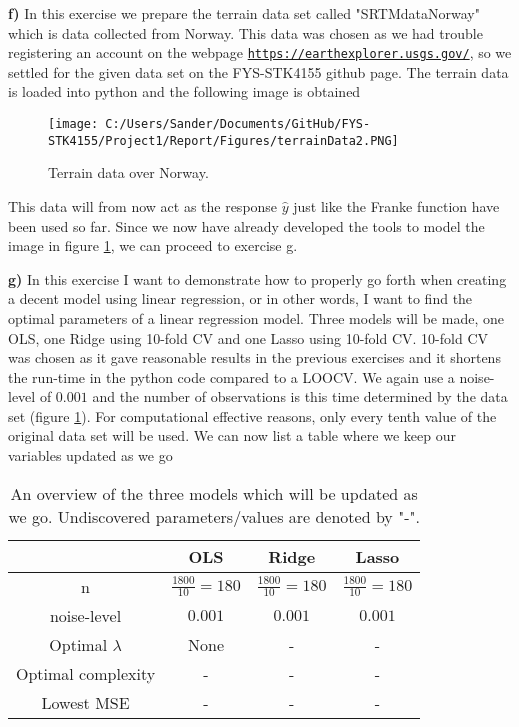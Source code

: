 \documentclass[12pt,a4paper]{article}
\begin{document}
\newpage

\noindent \textbf{f)} In this exercise we prepare the terrain data set called "SRTM\textunderscore data\textunderscore Norway" which is data collected from Norway. This data was chosen as we had trouble registering an account on the webpage \href{{https://earthexplorer.usgs.gov/}}{\nolinkurl{https://earthexplorer.usgs.gov/}}, so we settled for the given data set on the FYS-STK4155 github page. The terrain data is loaded into python and the following image is obtained

\begin{figure}[H]
\centering
\texttt{[image: C:/Users/Sander/Documents/GitHub/FYS-STK4155/Project1/Report/Figures/terrainData2.PNG]}
\caption{\label{fig:terrainData1} Terrain data over Norway.}
\end{figure}

\noindent This data will from now act as the response $\hat{y}$ just like the Franke function have been used so far. Since we now have already developed the tools to model the image in figure \ref{fig:terrainData1}, we can proceed to exercise g.

\newpage

\noindent \textbf{g)} In this exercise I want to demonstrate how to properly go forth when creating a decent model using linear regression, or in other words, I want to find the optimal parameters of a linear regression model. Three models will be made, one OLS, one Ridge using 10-fold CV and one Lasso using 10-fold CV. 10-fold CV was chosen as it gave reasonable results in the previous exercises and it shortens the run-time in the python code compared to a LOOCV. We again use a noise-level of $0.001$ and the number of observations is this time determined by the data set (figure \ref{fig:terrainData1}). For computational effective reasons, only every tenth value of the original data set will be used. We can now list a table where we keep our variables updated as we go

\begin{table}[h]
\caption{\label{tab:update1} An overview of the three models which will be updated as we go. Undiscovered parameters/values are denoted by "-".}
\centering
\begin{tabular}{c|c|c|c}
 & OLS & Ridge & Lasso\\
\hline
n & $\frac{1800}{10} = 180$ & $\frac{1800}{10} = 180$ & $\frac{1800}{10} = 180$\\
\hline
noise-level & $0.001$ & $0.001$ & $0.001$\\
\hline
Optimal $\lambda$ & None & - & -\\
\hline
Optimal complexity & - & - & -\\
\hline
Lowest MSE & - & - & -\\
\end{tabular}
\end{table}
\end{document}
